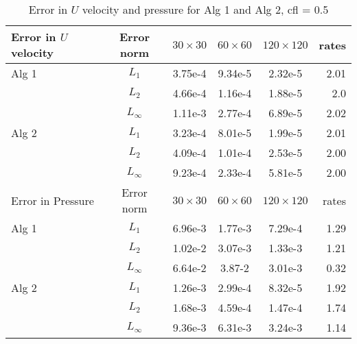 \begin{table}[H]
  \begin{center}
    \begin{tabular}{| l | c | c c c | r |}
    \hline
    Error in $U$ velocity & Error norm & $30 \times 30$ & $60 \times 60$ & $120 \times 120$ & rates \\
    \hline
    Alg 1
     & $L_1$ & 3.75e-4 & 9.34e-5 & 2.32e-5 & 2.01 \\
     & $L_2$ & 4.66e-4 & 1.16e-4 & 1.88e-5 & 2.0 \\
     & $L_\infty$ & 1.11e-3 & 2.77e-4 & 6.89e-5 & 2.02\\
    \hline
    Alg 2
     & $L_1$ & 3.23e-4 & 8.01e-5 & 1.99e-5 & 2.01 \\
     & $L_2$ & 4.09e-4 & 1.01e-4 & 2.53e-5 & 2.00 \\
     & $L_\infty$ & 9.23e-4 & 2.33e-4 & 5.81e-5 & 2.00\\
    \hline
    \hline
     Error in Pressure & Error norm & $30 \times 30$ & $60 \times 60$ & $120 \times 120$ & rates \\
     \hline
     Alg 1
     & $L_1$ & 6.96e-3 & 1.77e-3 & 7.29e-4 & 1.29 \\
     & $L_2$ & 1.02e-2 & 3.07e-3 & 1.33e-3 & 1.21 \\
     & $L_\infty$ & 6.64e-2 & 3.87-2 & 3.01e-3 & 0.32\\
    \hline
    Alg 2
     & $L_1$ & 1.26e-3 & 2.99e-4 & 8.32e-5 & 1.92 \\
     & $L_2$ & 1.68e-3 & 4.59e-4 & 1.47e-4 & 1.74 \\
     & $L_\infty$ & 9.36e-3 & 6.31e-3 & 3.24e-3 & 1.14\\
	\hline
    \end{tabular}
  \end{center}
  \caption{Error in $U$ velocity and pressure for Alg 1 and Alg 2, cfl = 0.5}
\end{table}\label{table:error for comparison between Alg 1 and Alg 2}

